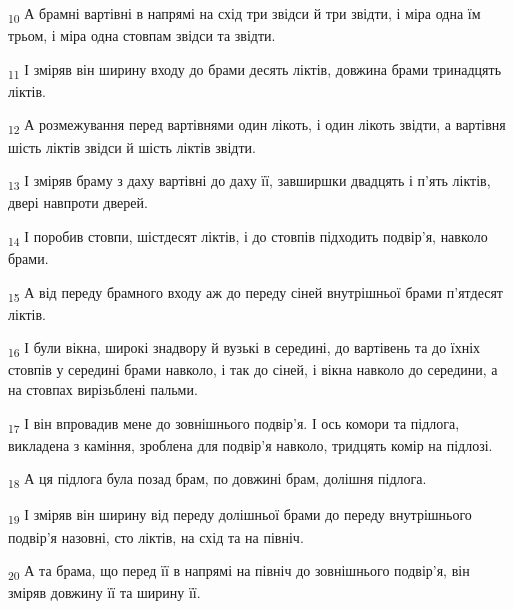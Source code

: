 \begin{tcolorbox}
\textsubscript{10} А брамні вартівні в напрямі на схід три звідси й три звідти, і міра одна їм трьом, і міра одна стовпам звідси та звідти.
\end{tcolorbox}
\begin{tcolorbox}
\textsubscript{11} І зміряв він ширину входу до брами десять ліктів, довжина брами тринадцять ліктів.
\end{tcolorbox}
\begin{tcolorbox}
\textsubscript{12} А розмежування перед вартівнями один лікоть, і один лікоть звідти, а вартівня шість ліктів звідси й шість ліктів звідти.
\end{tcolorbox}
\begin{tcolorbox}
\textsubscript{13} І зміряв браму з даху вартівні до даху її, завширшки двадцять і п'ять ліктів, двері навпроти дверей.
\end{tcolorbox}
\begin{tcolorbox}
\textsubscript{14} І поробив стовпи, шістдесят ліктів, і до стовпів підходить подвір'я, навколо брами.
\end{tcolorbox}
\begin{tcolorbox}
\textsubscript{15} А від переду брамного входу аж до переду сіней внутрішньої брами п'ятдесят ліктів.
\end{tcolorbox}
\begin{tcolorbox}
\textsubscript{16} І були вікна, широкі знадвору й вузькі в середині, до вартівень та до їхніх стовпів у середині брами навколо, і так до сіней, і вікна навколо до середини, а на стовпах вирізьблені пальми.
\end{tcolorbox}
\begin{tcolorbox}
\textsubscript{17} І він впровадив мене до зовнішнього подвір'я. І ось комори та підлога, викладена з каміння, зроблена для подвір'я навколо, тридцять комір на підлозі.
\end{tcolorbox}
\begin{tcolorbox}
\textsubscript{18} А ця підлога була позад брам, по довжині брам, долішня підлога.
\end{tcolorbox}
\begin{tcolorbox}
\textsubscript{19} І зміряв він ширину від переду долішньої брами до переду внутрішнього подвір'я назовні, сто ліктів, на схід та на північ.
\end{tcolorbox}
\begin{tcolorbox}
\textsubscript{20} А та брама, що перед її в напрямі на північ до зовнішнього подвір'я, він зміряв довжину її та ширину її.
\end{tcolorbox}
